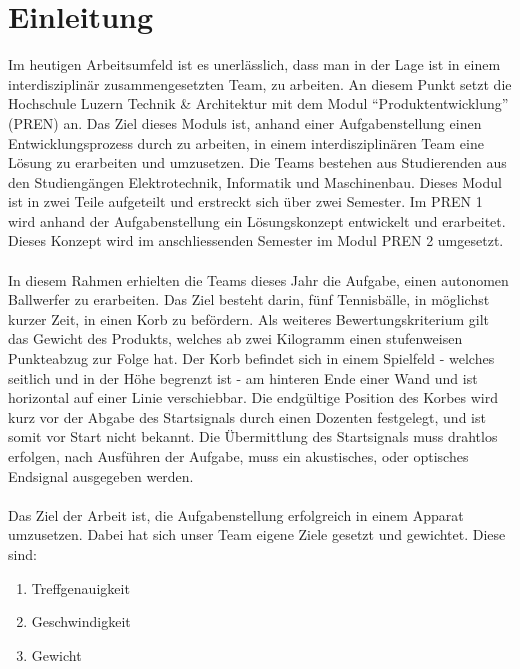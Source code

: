\section{Einleitung}
Im heutigen Arbeitsumfeld ist es unerlässlich, dass man in der Lage ist in einem interdisziplinär zusammengesetzten Team, zu arbeiten. An diesem Punkt setzt die Hochschule Luzern Technik \& Architektur mit dem Modul \enquote{Produktentwicklung} (PREN) an. Das Ziel dieses Moduls ist, anhand einer Aufgabenstellung einen Entwicklungsprozess durch zu arbeiten, in einem interdisziplinären Team eine Lösung zu erarbeiten und umzusetzen. Die Teams bestehen aus Studierenden aus den Studiengängen Elektrotechnik, Informatik und Maschinenbau. Dieses Modul ist in zwei Teile aufgeteilt und erstreckt sich über zwei Semester. Im PREN 1 wird anhand der Aufgabenstellung ein Lösungskonzept entwickelt und erarbeitet. Dieses Konzept wird im anschliessenden Semester im Modul PREN 2 umgesetzt.\\
\\
In diesem Rahmen erhielten die Teams dieses Jahr die Aufgabe, einen autonomen Ballwerfer zu erarbeiten. Das Ziel besteht darin, fünf Tennisbälle, in möglichst kurzer Zeit, in einen Korb zu befördern. Als weiteres Bewertungskriterium gilt das Gewicht des Produkts, welches ab zwei Kilogramm einen stufenweisen Punkteabzug zur Folge hat. Der Korb befindet sich in einem Spielfeld - welches seitlich und in der Höhe begrenzt ist - am hinteren Ende einer Wand und ist horizontal auf einer Linie verschiebbar. Die endgültige Position des Korbes wird kurz vor der Abgabe des Startsignals durch einen Dozenten festgelegt, und ist somit vor Start nicht bekannt. Die Übermittlung des Startsignals muss drahtlos erfolgen, nach Ausführen der Aufgabe, muss ein akustisches, oder optisches Endsignal ausgegeben werden.\\
\\
Das Ziel der Arbeit ist, die Aufgabenstellung erfolgreich in einem Apparat umzusetzen. Dabei hat sich unser Team eigene Ziele gesetzt und gewichtet. Diese sind:
\begin{enumerate}
    \item Treffgenauigkeit
    \item Geschwindigkeit
    \item Gewicht
\end{enumerate}
